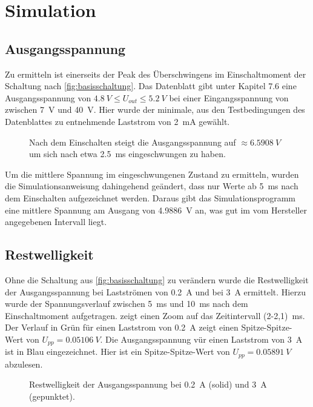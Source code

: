 \chapter{Simulation}
	\section{Ausgangsspannung}
		Zu ermitteln ist einerseits der Peak des Überschwingens im Einschaltmoment der Schaltung nach \cref{fig:basisschaltung}.
		Das Datenblatt gibt unter Kapitel 7.6 eine Ausgangsspannung von \(\SI{4,8}{V} \leq U_{out} \leq \SI{5,2}{V}\) bei einer Eingangsspannung von
		zwischen \SI{7}{V} und \SI{40}{V}. Hier wurde der minimale, aus den Testbedingungen des Datenblattes zu entnehmende Laststrom von \SI{2}{mA}
		gewählt.
		\begin{figure}[h]
			\centering
			
			\caption[Spannungsspitze nach dem Einschalten]{Nach dem Einschalten steigt die Ausgangsspannung auf \(\approx \SI{6,5908}{V}\)
			um sich nach etwa \SI{2,5}{ms} eingeschwungen zu haben.}
			\label{fig:einschaltpeak}
		\end{figure}
		Um die mittlere Spannung im eingeschwungenen Zustand zu ermitteln, wurden die Simulationsanweisung dahingehend geändert, dass
		nur Werte ab \SI{5}{ms} nach dem Einschalten aufgezeichnet werden. Daraus gibt das Simulationsprogramm eine mittlere
		Spannung am Ausgang von \SI{4,9886}{V} an, was gut im vom Hersteller angegebenen Intervall liegt.
	\newpage
	\section{Restwelligkeit}
		Ohne die Schaltung aus \cref{fig:basisschaltung} zu verändern wurde die Restwelligkeit der Ausgangsspannung bei
		Lastströmen von \SI{0,2}{A} und bei \SI{3}{A} ermittelt. Hierzu wurde der Spannungsverlauf zwischen \SI{5}{ms} und \SI{10}{ms}
		nach dem Einschaltmoment aufgetragen.  zeigt einen Zoom auf das Zeitintervall \SI{(2-2,1)}{ms}.
		Der Verlauf in Grün für einen Laststrom von \SI{0,2}{A} zeigt einen Spitze-Spitze-Wert von \(U_{pp} = \SI{0,05106}{V}\).
		Die Ausgangsspannung vür einen Laststrom von \SI{3}{A} ist in Blau eingezeichnet. Hier ist ein Spitze-Spitze-Wert von \(U_{pp} = \SI{0,05891}{V}\)
		abzulesen.
		\begin{figure}[h]
			\centering
			
			\caption[Restwelligkeit der Ausgangsspannung.]{Restwelligkeit der Ausgangsspannung bei \SI{0,2}{A} (solid) und \SI{3}{A} (gepunktet).}
			\label{fig:ripple}
		\end{figure}
